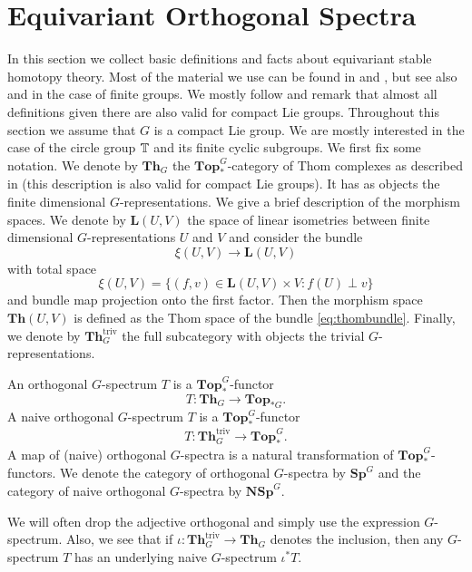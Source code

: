 \section{Equivariant Orthogonal Spectra}
In this section we collect basic definitions and facts about equivariant 
stable homotopy theory. Most of the material we use can be found in \cite{mandellmay}
and \cite{hillhopkinsravenel},
but see also \cite{schwedeequivariant} and \cite[Section~3-7]{rvadams}
in the case of finite groups. We mostly follow \cite{rvadams} and remark
that almost all definitions given there are also valid for compact Lie groups.
Throughout this section we assume that $G$ is a compact Lie group.
We are mostly interested in the case of the circle group $\mathbb{T}$ and its
finite cyclic subgroups. 
We first fix some notation. We denote by $\mathbf{Th}_G$ the $\mathbf{Top}_{\ast}^G$-category of
Thom complexes  as described in  \cite[Section~3]{rvadams} (this description
is also valid for compact Lie groups). It has as objects
the finite dimensional $G$-representations. We give a brief
description of the morphism
spaces. We denote by $\mathbf{L}(U,V)$ the space of linear isometries
between finite dimensional $G$-representations $U$ and $V$
and  consider the bundle
\begin{equation}\label{eq:thombundle}
\xi(U,V)\to \mathbf{L}(U,V)
\end{equation}
with total space
\[
\xi(U,V) = \{(f,v)\in \mathbf{L}(U,V)\times V: f(U)\perp v\}
\]
and bundle map projection onto the first factor. Then
the morphism space 
$\mathbf{Th}(U,V)$ is defined as the Thom space of the
bundle \eqref{eq:thombundle}.
Finally, we denote by $\mathbf{Th}_G^{\mathrm{triv}}$ the full subcategory
with objects the trivial $G$-representations.

\begin{mydef}
An orthogonal $G$-spectrum $T$ is a $\mathbf{Top}_{\ast}^G$-functor
\[
T:\mathbf{Th}_G\to \mathbf{Top}_{\ast G}.
\]
A naive orthogonal $G$-spectrum $T$ is a $\mathbf{Top}_{\ast}^G$-functor
\[
T:\mathbf{Th}^{\mathrm{triv}}_G\to \mathbf{Top}^G_{\ast}.
\]
A map of (naive) orthogonal $G$-spectra is a natural transformation of
$\mathbf{Top}_{\ast}^G$-functors. We denote the category of orthogonal
$G$-spectra by $\mathbf{Sp}^G$ and the category of
naive orthogonal $G$-spectra by $\mathbf{NSp}^G$.
\end{mydef}
We will often drop the adjective orthogonal and simply use the expression
$G$-spectrum. Also, we see that if $\iota: \mathbf{Th}_G^{\mathrm{triv}}
\to \mathbf{Th}_G$ denotes the inclusion, then any $G$-spectrum
$T$ has an underlying naive $G$-spectrum $\iota^\ast T$.


